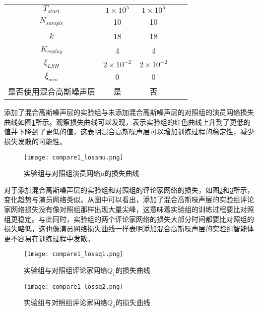 \begin{table}[htbp]
\begin{tabular}{ccccc}
        $T_{start}$             & $1\times 10^5$    & $1\times 10^5$    \\
        $N_{sample}$            & 10                & 10                \\
        $k$                     & 18                & 18                \\
        $K_{replay}$            & 4                 & 4                 \\
        $\xi_{LSH}$             & $2\times 10^{-2}$ & $2\times 10^{-2}$ \\
        $\xi_{sim}$             & 0                 & 0                 \\
        是否使用混合高斯噪声层  & 是                & 否                \\
    \bottomrule[1.5pt]
    \end{tabular}
    \end{table}

添加了混合高斯噪声层的实验组与未添加混合高斯噪声层的对照组的演员网络损失曲线如图\ref{cmp1lossmu}所示。观察损失曲线可以发现，表示实验组的红色曲线上升到了更低的值并下降到了更低的值，这表明混合高斯噪声层可以增加训练过程的稳定性，减少损失发散的可能性。

        \begin{figure}[htpb]
        \centering
        \texttt{[image: compare1\_lossmu.png]}
        \caption{实验组与对照组演员网络$\mu$的损失曲线}
            \label{cmp1lossmu}
        \end{figure}

对于添加混合高斯噪声层的实验组和对照组的评论家网络的损失，如图\ref{cmp1lossq1}和\ref{cmp1lossq2}所示，变化趋势与演员网络类似。从图中可以看出，添加了混合高斯噪声层的实验组评论家网络损失没有像对照组那样出现大量尖峰，这意味着实验组的训练过程要比对照组更稳定。与此同时，实验组的两个评论家网络的损失大部分时间都要比对照组的损失略低，这也像演员网络损失曲线一样表明添加混合高斯噪声层的实验组智能体更不容易在训练过程中发散。
        \begin{figure}[htpb]
        \centering
        \texttt{[image: compare1\_lossq1.png]}
        \caption{实验组与对照组评论家网络$Q_1$的损失曲线}
            \label{cmp1lossq1}
        \end{figure}

        \begin{figure}[htpb]
        \centering
        \texttt{[image: compare1\_lossq2.png]}
        \caption{实验组与对照组评论家网络$Q_2$的损失曲线}
            \label{cmp1lossq2}
        \end{figure}


